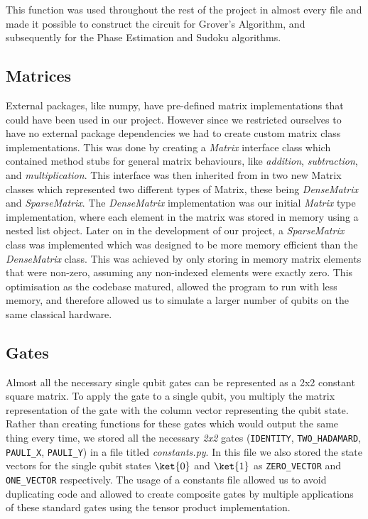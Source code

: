\documentclass{article}
\begin{document}
\medskip

This function was used throughout the rest of the project in almost every file and made it possible to construct the circuit for Grover's Algorithm, and subsequently for the Phase Estimation and Sudoku algorithms.

\subsection{\label{matrix}Matrices}

External packages, like numpy, have pre-defined matrix implementations that could have been used in our project.
However since we restricted ourselves to have no external package dependencies we had to create custom matrix class implementations.
This was done by creating a \textit{Matrix} interface class which contained method stubs for general matrix behaviours, like \textit{addition}, \textit{subtraction}, and \textit{multiplication}.
This interface was then inherited from in two new Matrix classes which represented two different types of Matrix, these being \textit{DenseMatrix} and \textit{SparseMatrix}.
The \textit{DenseMatrix} implementation was our initial \textit{Matrix} type implementation, where each element in the matrix was stored in memory using a nested list object.
Later on in the development of our project, a \textit{SparseMatrix} class was implemented which was designed to be more memory efficient than the \textit{DenseMatrix} class.
This was achieved by only storing in memory matrix elements that were non-zero, assuming any non-indexed elements were exactly zero.
This optimisation as the codebase matured, allowed the program to run with less memory, and therefore allowed us to simulate a larger number of qubits on the same classical hardware.

\subsection{Gates}

Almost all the necessary single qubit gates can be represented as a 2x2 constant square matrix.
To apply the gate to a single qubit, you multiply the matrix representation of the gate with the column vector representing the qubit state.
Rather than creating functions for these gates which would output the same thing every time, we stored all the necessary \textit{2x2} gates (\verb#IDENTITY#, \verb#TWO_HADAMARD#, \verb#PAULI_X#, \verb#PAULI_Y#) in a file titled \textit{constants.py}.
In this file we also stored the state vectors for the single qubit states $\ket{0}$ and $\ket{1}$ as \verb#ZERO_VECTOR# and \verb#ONE_VECTOR# respectively. 
The usage of a constants file allowed us to avoid duplicating code and allowed to create composite gates by multiple applications of these standard gates using the tensor product implementation.
\end{document}
